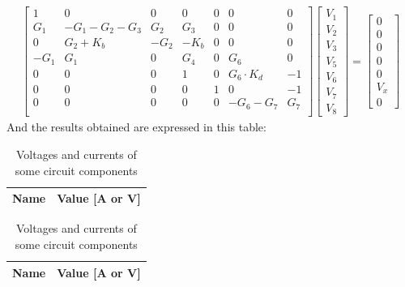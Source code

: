 \begin{gather}
	\begin{bmatrix}
		1 & 0 & 0 & 0 & 0 & 0 & 0 \\
		G_1 & -G_1 - G_2 - G_3 & G_2 & G_3 & 0 & 0 & 0 \\
		0 & G_2 + K_b & -G_2 & -K_b & 0 & 0 & 0 \\
		-G_1 & G_1 & 0 & G_4 & 0 & G_6 & 0 \\
		0 & 0 & 0 & 1 & 0 & G_6\cdot K_d & -1 \\
		0 & 0 & 0 & 0 & 1 & 0 & -1 \\
		0 & 0 & 0 & 0 & 0 & -G_6-G_7 & G_7 \\
	\end{bmatrix}
	\begin {bmatrix} V_1 \\ V_2 \\ V_3 \\ V_5  \\ V_6 \\ V_7 \\ V_8 \end{bmatrix}
	=
	\begin {bmatrix} 0  \\ 0  \\ 0  \\ 0 \\ 0  \\ V_x \\ 0 \end{bmatrix}
\end{gather}
And the results obtained are expressed in this table:
\begin{table}[H]
  \centering
  \begin{tabular}{|l|r|}
    \hline    
    {\bf Name} & {\bf Value [A or V]} \\ \hline
    
  \end{tabular}
  \caption{Voltages and currents of some circuit components}
  \label{tab:val21}
\end{table}

\begin{table}[H]
  \centering
  \begin{tabular}{|l|r|}
    \hline    
    {\bf Name} & {\bf Value [A or V]} \\ \hline
    
  \end{tabular}
  \caption{Voltages and currents of some circuit components}
  \label{tab:val22}
\end{table}

